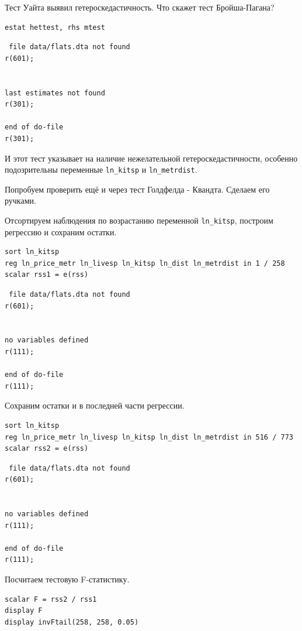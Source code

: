 \documentclass[]{book}
\begin{document}
Тест Уайта выявил гетероскедастичность. Что скажет тест Бройша-Пагана?

\begin{verbatim}
estat hettest, rhs mtest
\end{verbatim}

\begin{verbatim}
 file data/flats.dta not found
r(601);


last estimates not found
r(301);

end of do-file
r(301);
\end{verbatim}

И этот тест указывает на наличие нежелательной гетероскедастичности, особенно подозрительны переменные \texttt{ln\_kitsp} и \texttt{ln\_metrdist}.

Попробуем проверить ещё и через тест Голдфелда - Квандта. Сделаем его ручками.

Отсортируем наблюдения по возрастанию переменной \texttt{ln\_kitsp}, построим регрессию и сохраним остатки.

\begin{verbatim}
sort ln_kitsp
reg ln_price_metr ln_livesp ln_kitsp ln_dist ln_metrdist in 1 / 258
scalar rss1 = e(rss)
\end{verbatim}

\begin{verbatim}
 file data/flats.dta not found
r(601);


no variables defined
r(111);

end of do-file
r(111);
\end{verbatim}

Сохраним остатки и в последней части регрессии.

\begin{verbatim}
sort ln_kitsp
reg ln_price_metr ln_livesp ln_kitsp ln_dist ln_metrdist in 516 / 773
scalar rss2 = e(rss)
\end{verbatim}

\begin{verbatim}
 file data/flats.dta not found
r(601);


no variables defined
r(111);

end of do-file
r(111);
\end{verbatim}

Посчитаем тестовую F-статистику.

\begin{verbatim}
scalar F = rss2 / rss1
display F
display invFtail(258, 258, 0.05)
\end{verbatim}
\end{document}
